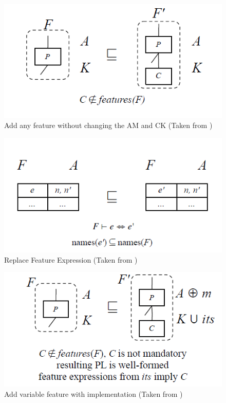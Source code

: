 \documentclass[12pt]{article}
\begin{document}
\begin{figure}[H]
\centering
\includegraphics[width=1\textwidth, frame]{images/AddAnyFeatureWithoutImpl}
\caption{Add any feature without changing the AM and CK (Taken from \cite{phdlmt})}
\end{figure}

\begin{figure}[H]
\centering
\includegraphics[width=1\textwidth, frame]{images/ReplaceFeatureExpression}
\caption{Replace Feature Expression (Taken from \cite{phdlmt})}
\end{figure}

\begin{figure}[H]
\centering
\includegraphics[width=1\textwidth, frame]{images/AddVariableFeatureWithImpl}
\caption{Add variable feature with implementation (Taken from \cite{phdlmt})}
\end{figure}
\end{document}
